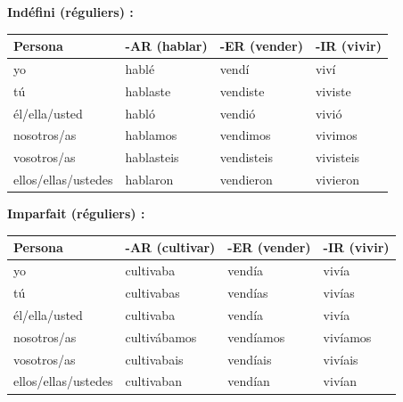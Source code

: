\documentclass[11pt]{article}
\begin{document}
\begin{propriete}
\textbf{Indéfini (réguliers) :}
\begin{center}
\begin{tabular}{|l|l|l|l|}
\hline
\rowcolor{popblueL} \textbf{Persona} & \textbf{-AR (hablar)} & \textbf{-ER (vender)} & \textbf{-IR (vivir)} \\
\hline
yo & hablé & vendí & viví \\
\hline
tú & hablaste & vendiste & viviste \\
\hline
él/ella/usted & habló & vendió & vivió \\
\hline
nosotros/as & hablamos & vendimos & vivimos \\
\hline
vosotros/as & hablasteis & vendisteis & vivisteis \\
\hline
ellos/ellas/ustedes & hablaron & vendieron & vivieron \\
\hline
\end{tabular}
\end{center}

\textbf{Imparfait (réguliers) :}
\begin{center}
\begin{tabular}{|l|l|l|l|}
\hline
\rowcolor{popblueL} \textbf{Persona} & \textbf{-AR (cultivar)} & \textbf{-ER (vender)} & \textbf{-IR (vivir)} \\
\hline
yo & cultivaba & vendía & vivía \\
\hline
tú & cultivabas & vendías & vivías \\
\hline
él/ella/usted & cultivaba & vendía & vivía \\
\hline
nosotros/as & cultivábamos & vendíamos & vivíamos \\
\hline
vosotros/as & cultivabais & vendíais & vivíais \\
\hline
ellos/ellas/ustedes & cultivaban & vendían & vivían \\
\hline
\end{tabular}
\end{center}


\end{propriete}
\end{document}
